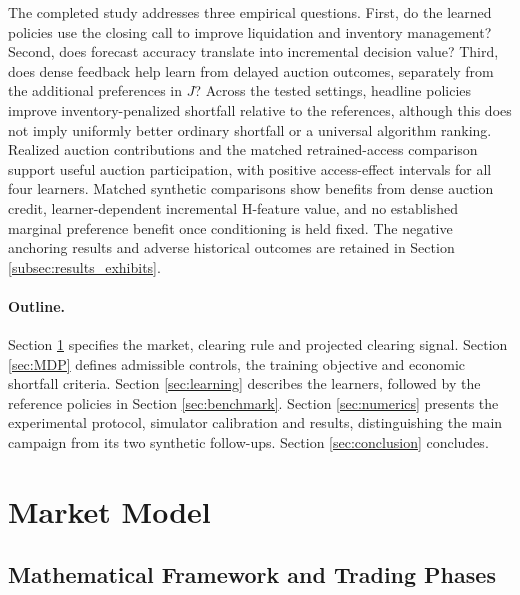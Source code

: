 \documentclass[11pt]{article}
\begin{document}
The completed study addresses three empirical questions. First, do the learned policies use the closing call to improve liquidation and inventory management? Second, does forecast accuracy translate into incremental decision value? Third, does dense feedback help learn from delayed auction outcomes, separately from the additional preferences in $J$? Across the tested settings, headline policies improve inventory-penalized shortfall relative to the references, although this does not imply uniformly better ordinary shortfall or a universal algorithm ranking. Realized auction contributions and the matched retrained-access comparison support useful auction participation, with positive access-effect intervals for all four learners. Matched synthetic comparisons show benefits from dense auction credit, learner-dependent incremental H-feature value, and no established marginal preference benefit once conditioning is held fixed. The negative anchoring results and adverse historical outcomes are retained in Section \ref{subsec:results_exhibits}.

\paragraph{Outline.}
Section \ref{sec:marketmodel} specifies the market, clearing rule and projected clearing signal. Section \ref{sec:MDP} defines admissible controls, the training objective and economic shortfall criteria. Section \ref{sec:learning} describes the learners, followed by the reference policies in Section \ref{sec:benchmark}. Section \ref{sec:numerics} presents the experimental protocol, simulator calibration and results, distinguishing the main campaign from its two synthetic follow-ups. Section \ref{sec:conclusion} concludes.
\endgroup

\section{Market Model}\label{sec:marketmodel}

\subsection{Mathematical Framework and Trading Phases}\label{sec:math}
\end{document}
